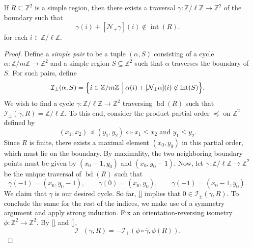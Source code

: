 \begin{proposition}
  If $R \subseteq \mathbb{Z}^2$ is a simple region, then there exists a traversal $\gamma \colon \mathbb{Z}/\ell\mathbb{Z} \to \mathbb{Z}^2$ of the boundary such that 
  \begin{equation}
    \gamma(i) + [\mathcal{N}_+\gamma](i) \not\in \operatorname{int}(R).
  \end{equation}
  for each $i \in \mathbb{Z}/\ell\mathbb{Z}$.
\end{proposition}
\begin{proof}
  Define a \emph{simple pair} to be a tuple $(\alpha, S)$ consisting of a cycle $\alpha \colon \mathbb{Z}/m\mathbb{Z} \to \mathbb{Z}^2$ and a simple region $S \subseteq \mathbb{Z}^2$ such that $\alpha$ traverses the boundary of $S$.
  For such pairs, define
  \begin{equation}
    \mathcal{I}_{\pm}(\alpha, S) = \Big\{i \in \mathbb{Z}/m\mathbb{Z} \Bigm| \alpha(i) + [\mathcal{N}_{\pm}\alpha](i) \not\in \operatorname{int}(S) \Big\}.
  \end{equation}
  We wish to find a cycle $\gamma \colon \mathbb{Z}/\ell\mathbb{Z} \to \mathbb{Z}^2$ traversing $\operatorname{bd}(R)$ such that $\mathcal{I}_{\pm}(\gamma, R) = \mathbb{Z}/\ell\mathbb{Z}$.
  To this end, consider the product partial order $\preceq$ on $\mathbb{Z}^2$ defined by
  \begin{equation}
    (x_1, x_2) \preceq (y_1, y_2) \iff x_1 \leq x_2 \text{ and } y_1 \leq y_2.
  \end{equation}
  Since $R$ is finite, there exists a maximal element $(x_0, y_0)$ in this partial order, which must lie on the boundary. 
  By maximality, the two neighboring boundary points must be given by $(x_0 - 1, y_0)$ and $(x_0, y_0 - 1)$.
  Now, let $\gamma \colon \mathbb{Z}/\ell \mathbb{Z} \to \mathbb{Z}^2$ be the unique traversal of $\operatorname{bd}(R)$ such that 
  \begin{equation}
    \gamma(-1) = (x_0, y_0 - 1), \quad \quad
    \gamma(0)   = (x_0, y_0),     \quad \quad
    \gamma(+1) = (x_0 - 1, y_0).
  \end{equation}
  We claim that $\gamma$ is our desired cycle. So far, \eqref{} implies that $0 \in \mathcal{I}_{\pm}(\gamma, R)$. To conclude the same for the rest of the indices, we make use of a symmetry argument and apply strong induction. Fix an orientation-reversing isometry $\phi \colon \mathbb{Z}^2 \to \mathbb{Z}^2$. By \eqref{} and \eqref{},
  \begin{equation}
    \mathcal{I}_{-}(\gamma, R) = -\mathcal{I}_{+}(\phi \circ \overline{\gamma}, \phi(R)).

\end{equation}
\end{proof}

